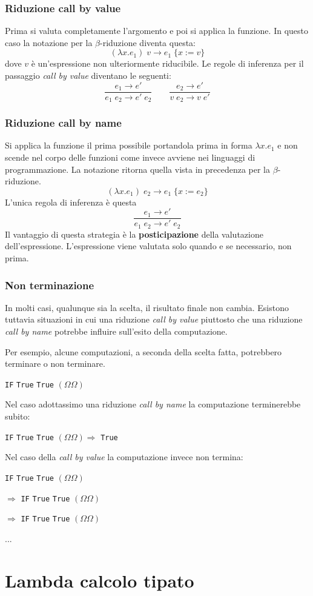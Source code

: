 \subsubsection{Riduzione call by value}
Prima si valuta completamente l'argomento e poi si applica la funzione. In questo caso la notazione per la
$\beta$-riduzione diventa questa:
\[ (\lambda x.e_1) \; v \rightarrow e_1 \; \{ x := v \} \]
dove $v$ è un'espressione non ulteriormente riducibile. Le regole di inferenza per il passaggio \emph{call by value}
diventano le seguenti:
\[
	\frac{e_1 \rightarrow e'}{e_1 \; e_2 \rightarrow e' \; e_2} \quad \quad
	\frac{e_2 \rightarrow e'}{v \; e_2 \rightarrow v \; e'}
\]

\subsubsection{Riduzione call by name}
Si applica la funzione il prima possibile portandola prima in forma $\lambda x.e_1$ e non scende nel corpo delle
funzioni come invece avviene nei linguaggi di programmazione. La notazione ritorna quella vista in precedenza per la
$\beta$-riduzione.
\[ (\lambda x.e_1) \; e_2 \rightarrow e_1 \; \{ x := e_2 \} \]
L'unica regola di inferenza è questa
\[ \frac{e_1 \rightarrow e'}{e_1 \; e_2 \rightarrow e' \; e_2} \]
Il vantaggio di questa strategia è la \textbf{posticipazione} della valutazione dell'espressione. L'espressione viene
valutata solo quando e se necessario, non prima.

\subsubsection{Non terminazione}
In molti casi, qualunque sia la scelta, il risultato finale non cambia. Esistono tuttavia situazioni in cui una riduzione
\emph{call by value} piuttosto che una riduzione \emph{call by name} potrebbe influire sull'esito della computazione.

Per esempio, alcune computazioni, a seconda della scelta fatta, potrebbero terminare o non terminare.
\begin{center}
	\verb|IF| \verb|True| \verb|True| $(\Omega \Omega)$
\end{center}
Nel caso adottassimo una riduzione \emph{call by name} la computazione terminerebbe subito:
\begin{center}
	\verb|IF| \verb|True| \verb|True| $(\Omega \Omega) \Rightarrow$ \verb|True|
\end{center}
Nel caso della \emph{call by value} la computazione invece non termina:
\begin{center}
	\verb|IF| \verb|True| \verb|True| $(\Omega \Omega)$

	$\Rightarrow$ \verb|IF| \verb|True| \verb|True| $(\Omega \Omega)$

	$\Rightarrow$ \verb|IF| \verb|True| \verb|True| $(\Omega \Omega)$

	...
\end{center}

\section{Lambda calcolo tipato}
